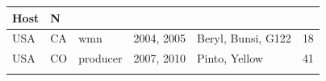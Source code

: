 \begin{longtable}[]{@{}lllrlr@{}}
\begin{minipage}[b]{0.29\columnwidth}
Host\strut
\end{minipage} & \begin{minipage}[b]{0.04\columnwidth}\raggedleft\strut
N\strut
\end{minipage}\tabularnewline
\midrule
\endhead
\begin{minipage}[t]{0.11\columnwidth}\raggedright\strut
USA\strut
\end{minipage} & \begin{minipage}[t]{0.08\columnwidth}\raggedright\strut
CA\strut
\end{minipage} & \begin{minipage}[t]{0.12\columnwidth}\raggedright\strut
wmn\strut
\end{minipage} & \begin{minipage}[t]{0.19\columnwidth}\raggedleft\strut
2004, 2005\strut
\end{minipage} & \begin{minipage}[t]{0.29\columnwidth}\raggedright\strut
Beryl, Bunsi, G122\strut
\end{minipage} & \begin{minipage}[t]{0.04\columnwidth}\raggedleft\strut
18\strut
\end{minipage}\tabularnewline
\begin{minipage}[t]{0.11\columnwidth}\raggedright\strut
USA\strut
\end{minipage} & \begin{minipage}[t]{0.08\columnwidth}\raggedright\strut
CO\strut
\end{minipage} & \begin{minipage}[t]{0.12\columnwidth}\raggedright\strut
producer\strut
\end{minipage} & \begin{minipage}[t]{0.19\columnwidth}\raggedleft\strut
2007, 2010\strut
\end{minipage} & \begin{minipage}[t]{0.29\columnwidth}\raggedright\strut
Pinto, Yellow\strut
\end{minipage} & \begin{minipage}[t]{0.04\columnwidth}\raggedleft\strut
41\strut
\end{minipage}\tabularnewline
\begin{minipage}[t]{0.11\columnwidth}\raggedright\strut
\strut
\end{minipage} & \begin{minipage}[t]{0.08\columnwidth}\raggedright\strut
\strut
\end{minipage} & \begin{minipage}[t]{0.12\columnwidth}\raggedright\strut

\end{minipage}
\end{longtable}
